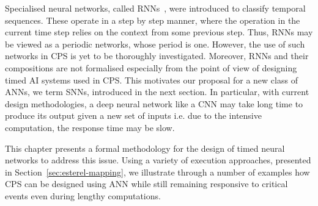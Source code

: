 Specialised neural networks, called \acfp{RNN}~\cite{medsker2001recurrent}, were introduced  
 to classify temporal sequences. These operate in a step by step manner, where the operation in the current 
time step relies on the context from some previous step. Thus, \acp{RNN} may be viewed as a periodic networks, whose
 period is one. However, the 
use of such networks in \ac{CPS} is yet to be thoroughly investigated. Moreover, 
\acp{RNN} and their compositions are not formalised especially from the point of view of designing timed AI 
systems used in \ac{CPS}. This motivates our proposal for a new class of \acp{ANN}, we term \acfp{SNN}, introduced in the next section.
In particular, with current design methodologies, a deep neural network like a \ac{CNN} may take long time 
to produce its output given a new set of inputs i.e. due to the intensive computation, the response time may be slow. 

This chapter presents a formal methodology for the design of timed neural networks to address this issue.
Using a variety of execution approaches, presented in  Section~\ref{sec:esterel-mapping}, we illustrate through a number
of examples how \ac{CPS} can be designed using \ac{ANN} while still remaining responsive to critical events even during lengthy computations.


